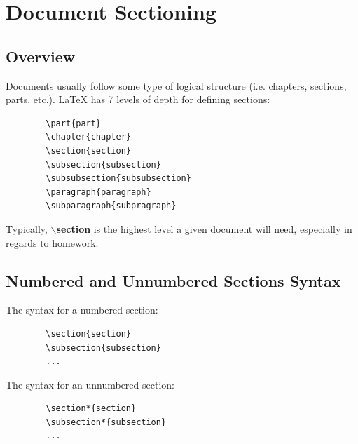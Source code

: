 \documentclass[]{article}
\newcommand{\dent}{\hspace{\parindent}} %
\begin{document}
    \section{Document Sectioning}
    \subsection{Overview}
    \dent Documents usually follow some type of logical structure (i.e. chapters, sections, parts, etc.). LaTeX has 7 levels of depth for defining sections:
    \begin{verbatim}
        \part{part}
        \chapter{chapter}
        \section{section}
        \subsection{subsection}
        \subsubsection{subsubsection}
        \paragraph{paragraph}
        \subparagraph{subpragraph}
    \end{verbatim}
    Typically, \textbf{$\backslash$section} is the highest level a given document will need, especially in regards to homework.
    \newpage
    \subsection{Numbered and Unnumbered Sections Syntax}
    \dent The syntax for a numbered section:
    \begin{verbatim}
        \section{section}
        \subsection{subsection}
        ...
    \end{verbatim}
    The syntax for an unnumbered section:
    \begin{verbatim}
        \section*{section}
        \subsection*{subsection}
        ...
    \end{verbatim}
\end{document}
